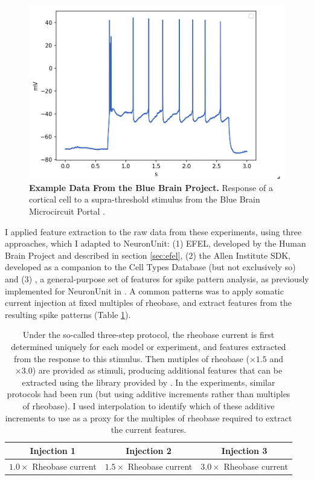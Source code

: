 \begin{figure}  
    \begin{center}
    \includegraphics[width=0.6\linewidth]{figures/multi_spiking_large_bbp}
    \caption[Example From Blue Brain Project]{\textbf{Example Data From the Blue Brain Project.}
    Response of a cortical cell to a supra-threshold stimulus from the Blue Brain Microcircuit Portal \citep{toledo}.}
    \label{fig:bbp_trace_adaption_late_spike}
    \end{center}
\end{figure}    

I applied feature extraction to the raw data from these experiments, using three approaches, which I adapted to NeuronUnit: (1) EFEL, developed by the Human Brain Project and described in section \ref{sec:efel}, (2) the Allen Institute SDK, developed as a companion to the Cell Types Database (but not exclusively so) and (3) \cite{druckmann2013hierarchical}, a general-purpose set of features for spike pattern analysis, as previously implemented for NeuronUnit in \cite{birgiolas2019towards}.
A common patterns was to apply somatic current injection at fixed multiples of rheobase, and extract features from the resulting spike patterns (Table \ref{table:three-step-stim}).

\begin{table}
\begin{center}
\begin{tabular}{|c|c|c|}
\toprule
Injection 1 & Injection 2 & Injection 3 \\
 \midrule
 $1.0 \times$ Rheobase current & $1.5 \times$ Rheobase current & $3.0 \times$ Rheobase current\\
\bottomrule
\end{tabular}
\caption[Three Step Stimulus Protocol]{Under the so-called three-step protocol, the rheobase current is first determined uniquely for each model or experiment, and features extracted from the response to this stimulus.
Then mutiples of rheobase ($\times 1.5$ and $\times 3.0$) are provided as stimuli, producing additional features that can be extracted using the library provided by \cite{EFEL}.
In the experiments, similar protocols had been run (but using additive increments rather than multiples of rheobase).
I used interpolation to identify which of these additive increments to use as a proxy for the multiples of rheobase required to extract the current features.}
\label{table:three-step-stim}
\end{center}
\end{table}

